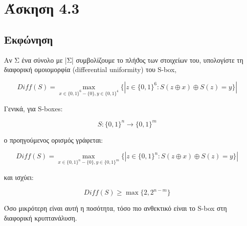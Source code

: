 \section{Άσκηση 4.3}

\subsection{Εκφώνηση}

Αν Σ ένα σύνολο με |Σ| συμβολίζουμε το πλήϑος των στοιχείων του, υπολογίστε τη διαφορική ομοιομορφία (differential uniformity) του S-box,

\begin{equation}
     Diff(S) = \max_{x \in \{0,1\}^6 - \{0\}, y\in \{0,1\}^4} \{|z \in \{0,1\}^6 : S(z \oplus x) \oplus S(z) = y\}|
\end{equation}

Γενικά, για S-boxes:

\begin{equation}
    S : \{0, 1\}^n \rightarrow \{0, 1\}^m
\end{equation}

ο προηγούμενος ορισμός γράφεται:

\begin{equation}
     Diff(S) = \max_{x \in \{0,1\}^n - \{0\}, y\in \{0,1\}^m} \{|z \in \{0,1\}^n : S(z \oplus x) \oplus S(z) = y\}|
\end{equation}

και ισχύει:

\begin{equation}
    Diff(S) \ge \max \{2, 2^{n-m}\}
\end{equation}

Όσο μικρότερη είναι αυτή η ποσότητα, τόσο πιο ανθεκτικό είναι το S-box στη διαφορική κρυπτανάλυση.